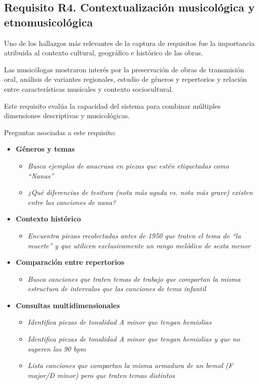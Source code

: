 \subsection{Requisito R4. Contextualización musicológica y etnomusicológica}
Uno de los hallazgos más relevantes de la captura de requisitos fue la importancia atribuida al contexto cultural, geográfico e histórico de las obras.

Las musicólogas mostraron interés por la preservación de obras de transmisión oral, análisis de variantes regionales, estudio de géneros y repertorios y relación entre características musicales y contexto sociocultural.

Este requisito evalúa la capacidad del sistema para combinar múltiples dimensiones descriptivas y musicológicas.

Preguntas asociadas a este requisito:
\begin{itemize}
    \item \textbf{Géneros y temas}
    \begin{itemize}
    \item \textit{Busca ejemplos de anacrusa en piezas que estén etiquetadas como ``Nanas''}
    \item \textit{¿Qué diferencias de tesitura (nota más aguda vs. nota más grave) existen entre las canciones de nana?}
    \end{itemize}
    \item \textbf{Contexto histórico}
    \begin{itemize}
    \item \textit{Encuentra piezas recolectadas antes de 1950 que traten el tema de ``la muerte'' y que utilicen exclusivamente un rango melódico de sexta menor}
    \end{itemize}
    \item \textbf{Comparación entre repertorios}
    \begin{itemize}
    \item \textit{Busca canciones que traten temas de trabajo que compartan la misma estructura de intervalos que las canciones de tema infantil}
    \end{itemize}
    \item \textbf{Consultas multidimensionales}
    \begin{itemize}
    \item \textit{Identifica piezas de tonalidad A minor que tengan hemiolias}
    \item \textit{Identifica piezas de tonalidad A minor que tengan hemiolias y que no superen los 90 bpm}
    \item \textit{Lista canciones que compartan la misma armadura de un bemol (F major/D minor) pero que traten temas distintos}
    \end{itemize}
\end{itemize}

